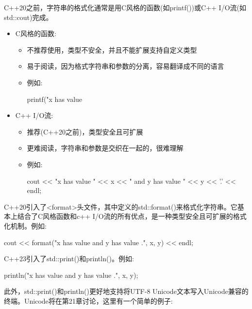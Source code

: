 
C++20之前，字符串的格式化通常是用C风格的函数(如printf())或C++ I/O流(如std::cout)完成。

\begin{itemize}
\item
C风格的函数:

\begin{itemize}
\item
不推荐使用，类型不安全，并且不能扩展支持自定义类型

\item
易于阅读，因为格式字符串和参数的分离，容易翻译成不同的语言

\item
例如:
\begin{cpp}
    printf("x has value %
\end{cpp}
\end{itemize}

\item
C++ I/O流:

\begin{itemize}
\item
推荐(C++20之前)，类型安全且可扩展

\item
更难阅读，字符串和参数是交织在一起的，很难理解

\item
例如:
\begin{cpp}
    cout << "x has value " << x << " and y has value " << y << '.' << endl;
\end{cpp}
\end{itemize}

\end{itemize}

C++20引入了<format>头文件，其中定义的std::format()来格式化字符串。它基本上结合了C风格函数和c++ I/O流的所有优点，是一种类型安全且可扩展的格式化机制。例如:

\begin{cpp}
cout << format("x has value {} and y has value {}.", x, y) << endl;
\end{cpp}

C++23引入了std::print()和println()。例如:

\begin{cpp}
println("x has value {} and y has value {}.", x, y);
\end{cpp}

此外，std::print()和println()更好地支持将UTF-8 Unicode文本写入Unicode兼容的终端。Unicode将在第21章讨论，这里有一个简单的例子:

